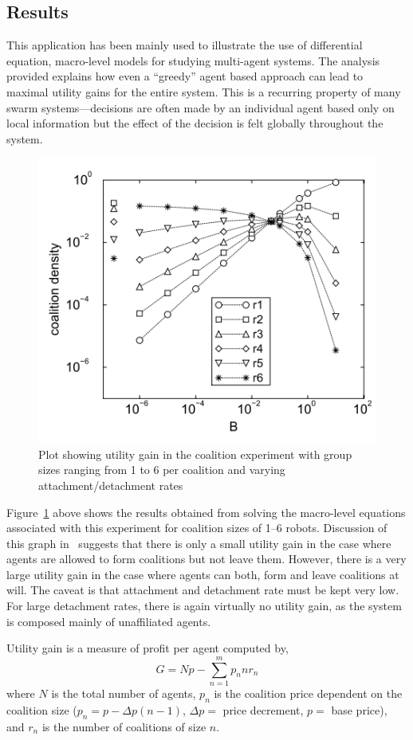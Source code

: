 \documentclass[Main.tex]{subfiles}
\begin{document}
\subsection*{Results}
This application has been mainly used to illustrate the use of differential equation, macro-level models for studying multi-agent systems\cite{Lerman2001a, Lerman2001b}. The analysis provided explains how even a ``greedy'' agent based approach can lead to maximal utility gains for the entire system. This is a recurring property of many swarm systems---decisions are often made by an individual agent based only on local information but the effect of the decision is felt globally throughout the system.

\begin{figure}[!ht]
\centering\includegraphics[width=.5\textwidth]{assets/coalDensity.png}
\caption{Plot showing utility gain in the coalition experiment with group sizes ranging from 1 to 6 per coalition and varying attachment/detachment rates}\label{fig:coaldensity}
\end{figure}

Figure~\ref{fig:coaldensity} above shows the results obtained from solving the macro-level equations associated with this experiment for coalition sizes of 1--6 robots. Discussion of this graph in~\cite{Lerman2000} suggests that there is only a small utility gain in the case where agents are allowed to form coalitions but not leave them. However, there is a very large utility gain in the case where agents can both, form and leave coalitions at will. The caveat is that attachment and detachment rate must be kept very low. For large detachment rates, there is again virtually no utility gain, as the system is composed mainly of unaffiliated agents.

Utility gain is a measure of profit per agent computed by,
\begin{equation*}
G = Np - \sum\limits_{n=1}^{m}p_n nr_n
\end{equation*}
where $N$ is the total number of agents, $p_n$ is the coalition price dependent on the coalition size ($p_n = p - \Delta p(n - 1)$, $\Delta p =$ price decrement, $p =$ base price), and $r_n$ is the number of coalitions of size $n$. 
\end{document}
